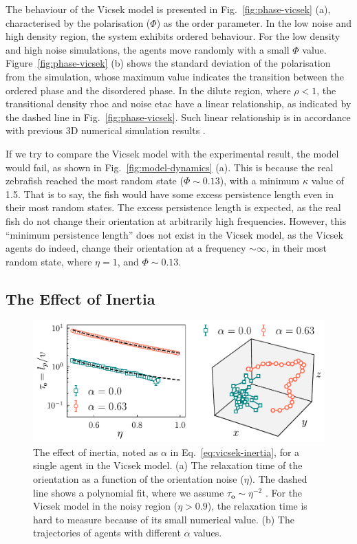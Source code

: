 \documentclass[11pt,twoside]{report}
\begin{document}
The behaviour of the Vicsek model is presented in Fig.~\ref{fig:phase-vicsek} (a), characterised by the polarisation ($\Phi$) as the order parameter. In the low noise and high density region, the system exhibits ordered behaviour. For the low density and high noise simulations, the agents move randomly with a small $\Phi$ value. Figure~\ref{fig:phase-vicsek} (b) shows the standard deviation of the polarisation from the simulation, whose maximum value indicates the transition between the ordered phase and the disordered phase. In the dilute region, where $\rho < 1$, the transitional density \gls{rhoc} and noise \gls{etac} have a linear relationship, as indicated by the dashed line in Fig.~\ref{fig:phase-vicsek}. Such linear relationship is in accordance with previous 3D numerical simulation results \cite{puzzo2019}.

 

If we try to compare the Vicsek model with the experimental result, the model would fail, as shown in Fig.~\ref{fig:model-dynamics} (a). 
This is because the real zebrafish reached the most random state ($\Phi \sim 0.13$), with a minimum $\kappa$ value of 1.5. That is to say, the fish would have some excess persistence length even in their most random states.
The excess persistence length is expected, as the real fish do not change their orientation at arbitrarily high frequencies. However, this ``minimum persistence length'' does not exist in the Vicsek model, as the Vicsek agents do indeed, change their orientation at a frequency $\sim \infty$, in their most random state, where $\eta = 1$, and $\Phi \sim 0.13$.


\subsection{The Effect of Inertia}
\label{section:model-vicsek-inertia}

\begin{figure}
  \includegraphics[width=\linewidth]{vicsek-inertia}
  \caption[The effect of inertia in the Vicsek model]{
	The effect of inertia, noted as $\alpha$ in Eq.~\ref{eq:vicsek-inertia}, for a single agent in the Vicsek model.
	(a) The relaxation time of the orientation as a function of the orientation noise ($\eta$). The dashed line shows a polynomial fit, where we assume $\tau_\mathbf{o} \sim \eta^{-2}$ \cite{ginelli2016}. For the Vicsek model in the noisy region ($\eta > 0.9$), the relaxation time is hard to measure because of its small numerical value.
	(b) The trajectories of agents with different $\alpha$ values.
  }
  \label{fig:vicsek-inertia}
\end{figure}
\end{document}
